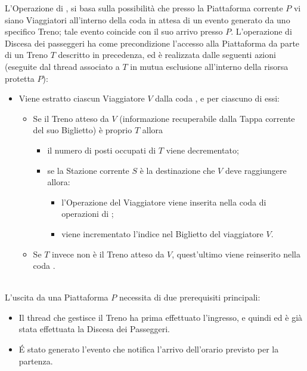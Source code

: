 \begin{description}
		L'Operazione di , si basa sulla possibilità che presso la Piattaforma corrente $P$ vi siano Viaggiatori all'interno della coda  in attesa di un evento generato da uno specifico Treno; tale evento coincide con il suo arrivo presso $P$. L'operazione di Discesa dei passeggeri ha come precondizione l'accesso alla Piattaforma da parte di un Treno $T$ descritto in precedenza, ed è realizzata dalle seguenti azioni (eseguite dal thread associato a $T$ in mutua esclusione all'interno della risorsa protetta $P$):
		\begin{itemize}
			\item Viene estratto ciascun Viaggiatore $V$ dalla coda , e per ciascuno di essi:
			\begin{itemize}
				\item Se il Treno atteso da $V$ (informazione recuperabile dalla Tappa corrente del suo Biglietto) è proprio $T$ allora
					\begin{itemize}
						\item il numero di posti occupati di $T$ viene decrementato;
						\item se la Stazione corrente $S$  è la destinazione che $V$ deve raggiungere allora:
							\begin{itemize}
								\item l'Operazione  del Viaggiatore viene inserita nella coda di operazioni di ;
								\item viene incrementato l'indice  nel Biglietto del viaggiatore $V$.
							\end{itemize}
					\end{itemize}
				\item Se $T$ invece non è il Treno atteso da $V$, quest'ultimo viene reinserito nella coda .
			\end {itemize}
		\end{itemize}
	
	\item{}\\
		
		L'uscita da una Piattaforma $P$ necessita di due prerequisiti principali:
		
			\begin{itemize}
				\item Il thread che gestisce il Treno ha prima effettuato l'ingresso, e quindi  ed è già stata effettuata la Discesa dei Passeggeri.
				\item \'E stato generato l'evento che notifica l'arrivo dell'orario previsto per la partenza.
			\end{itemize}
		

\end{description}
